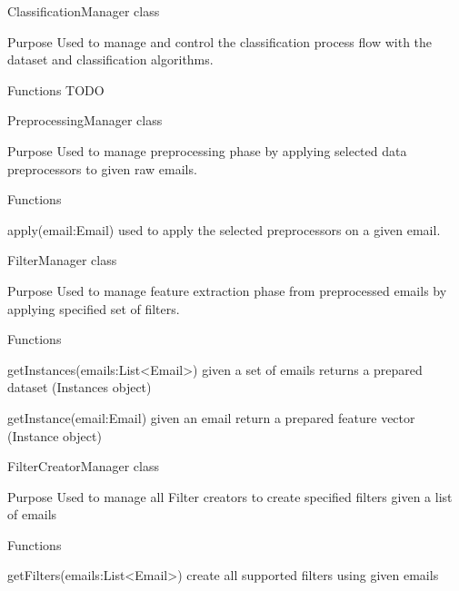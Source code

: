 \documentclass[12pt]{article}
\newenvironment{my_itemize}
{\begin{itemize}
  \setlength{\itemsep}{0cm}
  \setlength{\parskip}{0cm}}
{\end{itemize}}
\newenvironment{my_desc}
{\begin{description}
  \setlength{\itemsep}{0cm}
  \setlength{\parskip}{0cm}}
{\end{description}}
\begin{document}
\begin{my_itemize}
  \item ClassificationManager class
  \begin{my_desc}
    \item[Purpose] Used to manage and control the classification process flow
      with the dataset and classification algorithms.
    \item[Functions] TODO
  \end{my_desc}
  \item PreprocessingManager class
  \begin{my_desc}
    \item[Purpose] Used to manage preprocessing phase by applying selected data preprocessors
      to given raw emails.
    \item[Functions] \hfill
    \begin{my_itemize}
      \item apply(email:Email) used to apply the selected preprocessors on a given email.
    \end{my_itemize}
  \end{my_desc}

  \item FilterManager class
  \begin{my_desc}
    \item[Purpose] Used to manage feature extraction phase from preprocessed emails by applying
      specified set of filters.
    \item[Functions] \hfill
    \begin{my_itemize}
      \item getInstances(emails:List<Email>) given a set of emails returns a prepared dataset (Instances object)
      \item getInstance(email:Email) given an email return a prepared feature vector (Instance object)
    \end{my_itemize}

  \end{my_desc}

  \item FilterCreatorManager class
  \begin{my_desc}
    \item[Purpose] Used to manage all Filter creators to create specified filters given a list of emails
    \item[Functions] \hfill
    \begin{my_itemize}
      \item getFilters(emails:List<Email>) create all supported filters using given emails
    \end{my_itemize}


\end{my_desc}
\end{my_itemize}
\end{document}
